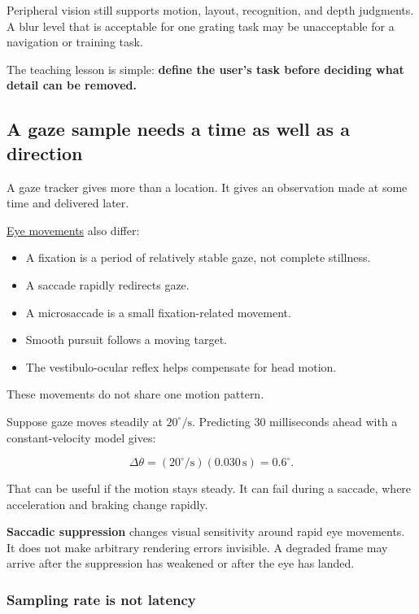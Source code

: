 Peripheral vision still supports motion, layout, recognition, and depth judgments. A blur level that is acceptable for one grating task may be unacceptable for a navigation or training task.

The teaching lesson is simple: \textbf{define the user's task before deciding what detail can be removed.}

\subsection{A gaze sample needs a time as well as a direction}\label{04-visual-computing-ii-ch043-a-gaze-sample-needs-a-time-as-well-as-a-direction}

A gaze tracker gives more than a location. It gives an observation made at some time and delivered later.

\hyperref[appendix-a6f2c4fe1996]{Eye movements} also differ:

\begin{itemize}
\tightlist
\item
  A fixation is a period of relatively stable gaze, not complete stillness.
\item
  A saccade rapidly redirects gaze.
\item
  A microsaccade is a small fixation-related movement.
\item
  Smooth pursuit follows a moving target.
\item
  The vestibulo-ocular reflex helps compensate for head motion.
\end{itemize}

These movements do not share one motion pattern.

Suppose gaze moves steadily at \(20^\circ/\mathrm{s}\). Predicting 30 milliseconds ahead with a constant-velocity model gives:

\[
\Delta\theta
=(20^\circ/\mathrm{s})(0.030\,\mathrm{s})
=0.6^\circ.
\]

That can be useful if the motion stays steady. It can fail during a saccade, where acceleration and braking change rapidly.

\textbf{Saccadic suppression} changes visual sensitivity around rapid eye movements. It does not make arbitrary rendering errors invisible. A degraded frame may arrive after the suppression has weakened or after the eye has landed.

\subsubsection{Sampling rate is not latency}\label{04-visual-computing-ii-ch043-sampling-rate-is-not-latency}


